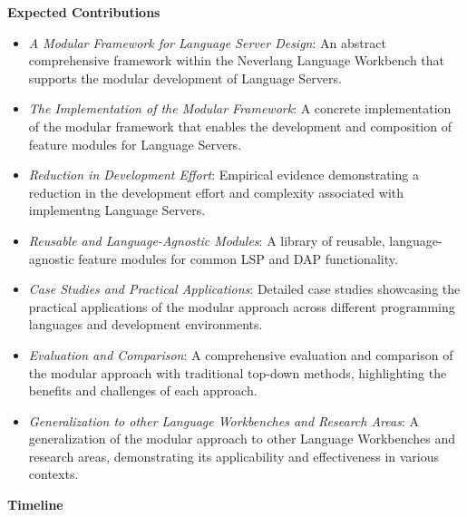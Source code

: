 \hfill \break
\noindent
\textbf{Expected Contributions}

\begin{itemize}
    \item \textit{A Modular Framework for Language Server Design}: An abstract comprehensive framework within the Neverlang Language Workbench that supports the modular development of Language Servers.
    \item \textit{The Implementation of the Modular Framework}: A concrete implementation of the modular framework that enables the development and composition of feature modules for Language Servers.
    \item \textit{Reduction in Development Effort}: Empirical evidence demonstrating a reduction in the development effort and complexity associated with implementng Language Servers.
    \item \textit{Reusable and Language-Agnostic Modules}: A library of reusable, language-agnostic feature modules for common LSP and DAP functionality.
    \item \textit{Case Studies and Practical Applications}: Detailed case studies showcasing the practical applications of the modular approach across different programming languages and development environments.
    \item \textit{Evaluation and Comparison}: A comprehensive evaluation and comparison of the modular approach with traditional top-down methods, highlighting the benefits and challenges of each approach.
    \item \textit{Generalization to other Language Workbenches and Research Areas}: A generalization of the modular approach to other Language Workbenches and research areas, demonstrating its applicability and effectiveness in various contexts.
\end{itemize}


\hfill \break
\noindent
\textbf{Timeline}


